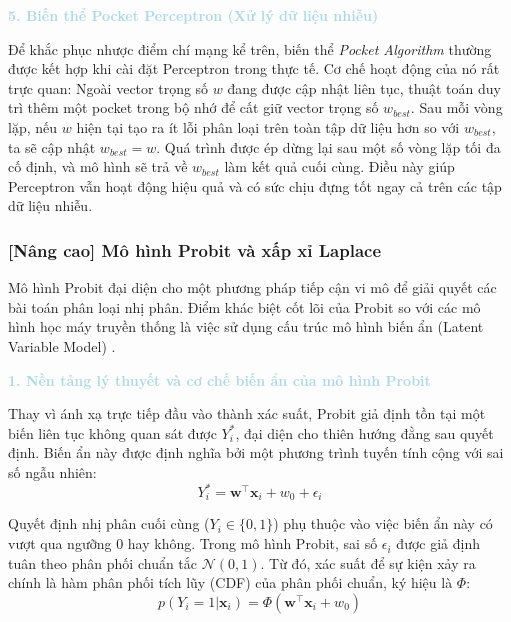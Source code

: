 \vspace{0.5em}
\noindent\textcolor{lightblue}{\textbf{5. Biến thể Pocket Perceptron (Xử lý dữ liệu nhiễu)}}
\vspace{0.5em}

Để khắc phục nhược điểm chí mạng kể trên, biến thể \textit{Pocket Algorithm} thường được kết hợp khi cài đặt Perceptron trong thực tế. Cơ chế hoạt động của nó rất trực quan: 
Ngoài vector trọng số $w$ đang được cập nhật liên tục, thuật toán duy trì thêm một pocket trong bộ nhớ để cất giữ vector trọng số $w_{best}$. Sau mỗi vòng lặp, nếu $w$ hiện tại tạo ra ít lỗi phân loại trên toàn tập dữ liệu hơn so với $w_{best}$, ta sẽ cập nhật $w_{best} = w$. Quá trình được ép dừng lại sau một số vòng lặp tối đa cố định, và mô hình sẽ trả về $w_{best}$ làm kết quả cuối cùng. Điều này giúp Perceptron vẫn hoạt động hiệu quả và có sức chịu đựng tốt ngay cả trên các tập dữ liệu nhiễu.

\subsubsection{[Nâng cao] Mô hình Probit và xấp xỉ Laplace}

Mô hình Probit đại diện cho một phương pháp tiếp cận vi mô để giải quyết các bài toán phân loại nhị phân. Điểm khác biệt cốt lõi của Probit so với các mô hình học máy truyền thống là việc sử dụng cấu trúc mô hình biến ẩn (Latent Variable Model) \cite{bishop2006pattern}.

\vspace{0.5em}
\noindent\textcolor{lightblue}{\textbf{1. Nền tảng lý thuyết và cơ chế biến ẩn của mô hình Probit}}
\vspace{0.5em}

Thay vì ánh xạ trực tiếp đầu vào thành xác suất, Probit giả định tồn tại một biến liên tục không quan sát được $Y_i^*$, đại diện cho thiên hướng đằng sau quyết định. Biến ẩn này được định nghĩa bởi một phương trình tuyến tính cộng với sai số ngẫu nhiên:
\begin{equation}
    Y_i^* = \mathbf{w}^\top \mathbf{x}_i + w_0 + \epsilon_i
\end{equation}

Quyết định nhị phân cuối cùng ($Y_i \in \{0, 1\}$) phụ thuộc vào việc biến ẩn này có vượt qua ngưỡng $0$ hay không. Trong mô hình Probit, sai số $\epsilon_i$ được giả định tuân theo phân phối chuẩn tắc $\mathcal{N}(0, 1)$. Từ đó, xác suất để sự kiện xảy ra chính là hàm phân phối tích lũy (CDF) của phân phối chuẩn, ký hiệu là $\Phi$:
\begin{equation}
    p(Y_i=1 | \mathbf{x}_i) = \Phi(\mathbf{w}^\top \mathbf{x}_i + w_0)
\end{equation}


